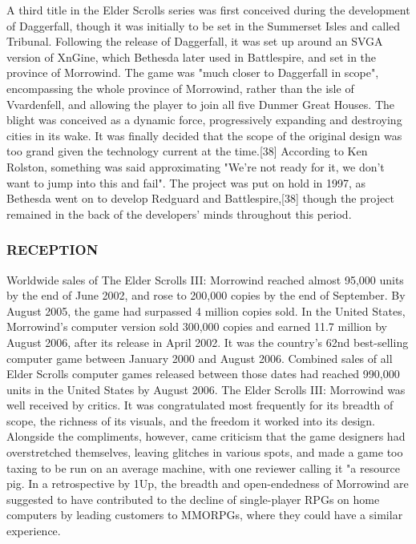 \documentclass[a4paper,10pt]{book}
\begin{document}
          A third title in the Elder Scrolls series was first conceived during the development of Daggerfall, though it was initially to be set in the Summerset Isles and called Tribunal. Following the release of Daggerfall, it was set up around an SVGA version of XnGine, which Bethesda later used in Battlespire, and set in the province of Morrowind. The game was "much closer to Daggerfall in scope", encompassing the whole province of Morrowind, rather than the isle of Vvardenfell, and allowing the player to join all five Dunmer Great Houses. The blight was conceived as a dynamic force, progressively expanding and destroying cities in its wake. It was finally decided that the scope of the original design was too grand given the technology current at the time.[38] According to Ken Rolston, something was said approximating "We're not ready for it, we don't want to jump into this and fail". The project was put on hold in 1997, as Bethesda went on to develop Redguard and Battlespire,[38] though the project remained in the back of the developers' minds throughout this period.
         
 
 \subsubsection{RECEPTION }
 
          Worldwide sales of The Elder Scrolls III: Morrowind reached almost 95,000 units by the end of June 2002, and rose to 200,000 copies by the end of September. By August 2005, the game had surpassed 4 million copies sold. In the United States, Morrowind's computer version sold 300,000 copies and earned 11.7 million by August 2006, after its release in April 2002. It was the country's 62nd best-selling computer game between January 2000 and August 2006. Combined sales of all Elder Scrolls computer games released between those dates had reached 990,000 units in the United States by August 2006.
          The Elder Scrolls III: Morrowind was well received by critics. It was congratulated most frequently for its breadth of scope, the richness of its visuals, and the freedom it worked into its design. Alongside the compliments, however, came criticism that the game designers had overstretched themselves, leaving glitches in various spots, and made a game too taxing to be run on an average machine, with one reviewer calling it "a resource pig. In a retrospective by 1Up, the breadth and open-endedness of Morrowind are suggested to have contributed to the decline of single-player RPGs on home computers by leading customers to MMORPGs, where they could have a similar experience.
         
\end{document}
